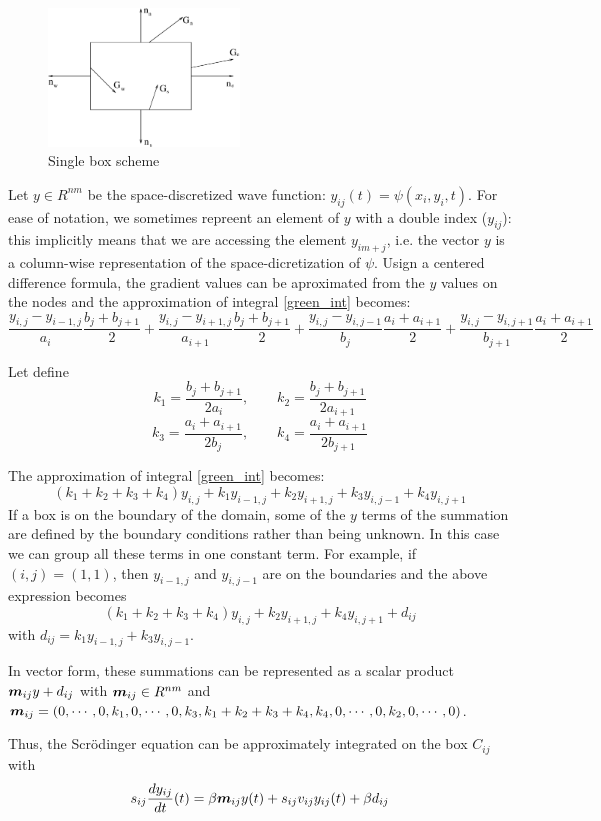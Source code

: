 \documentclass[a4paper,11pt]{article}
\newcommand{\ve}[1]{\mbox{\boldmath $ #1$}}
\begin{document}
\begin{figure}
 \label{fig:single_box}
\centerline{\includegraphics[width=2in] {box.eps}}
\caption{Single box scheme}
\end{figure}

Let $y \in R^{nm}$ be the space-discretized wave function: $y_{ij}(t) = \psi(x_i, y_i, t)$. For ease of notation, we sometimes repreent an element of $y$ with a double index ($y_{ij}$): this implicitly means that we are accessing the element $y_{im+j}$, i.e. the vector $y$ is a column-wise representation of the space-dicretization of $\psi$.
Usign a centered difference formula, the gradient values can be aproximated from the $y$ values on the nodes and the approximation of integral \ref{green_int} becomes:
$$ \frac{y_{i,j}-y_{i-1,j}}{a_i} \frac{b_j+b_{j+1}}{2} +
   \frac{y_{i,j}-y_{i+1,j}}{a_{i+1}} \frac{b_j+b_{j+1}}{2} +
   \frac{y_{i,j}-y_{i,j-1}}{b_j} \frac{a_i+a_{i+1}}{2} +
   \frac{y_{i,j}-y_{i,j+1}}{b_{j+1}} \frac{a_i+a_{i+1}}{2} $$

Let define
$$ k_1 = \frac{b_j+b_{j+1}}{2a_i}, \qquad k_2 = \frac{b_j+b_{j+1}}{2a_{i+1}} $$
$$ k_3 = \frac{a_i+a_{i+1}}{2b_j}, \qquad k_4 = \frac{a_i+a_{i+1}}{2b_{j+1}} $$

The approximation of integral \ref{green_int} becomes:
$$ (k_1+k_2+k_3+k_4) y_{i, j} + k_1 y_{i-1,j} + k_2 y_{i+1,j} + k_3 y_{i,j-1} + k_4 y_{i,j+1} $$
If a box is on the boundary of the domain, some of the $y$ terms of the summation are defined by the boundary conditions rather than being unknown. In this case we can group all these terms in one constant term. For example, if $(i, j) = (1, 1)$, then $y_{i-1,j}$ and $y_{i,j-1}$ are on the boundaries and the above expression becomes
$$ (k_1+k_2+k_3+k_4) y_{i, j} + k_2 y_{i+1,j} + k_4 y_{i,j+1} + d_{ij}$$
with $ d_{ij} = k_1 y_{i-1,j} + k_3 y_{i,j-1} $.

In vector form, these summations can be represented as a scalar product $\ve m_{ij} y + d_{ij}$ with $\ve m_{ij} \in R^{nm}$ and
$\ve m_{ij} = (0,\cdots, 0, k_1, 0, \cdots, 0, k_3, k_1+k_2+k_3+k_4, k_4, 0,\cdots, 0, k_2, 0, \cdots, 0)$.

Thus, the Scr\"{o}dinger equation can be approximately integrated on the box $C_{ij}$ with
$$ s_{ij} \frac{d y_{ij}}{dt}(t) =  \beta \ve m_{ij} y(t) + s_{ij} v_{ij} y_{ij}(t) + \beta d_{ij}$$
\end{document}
